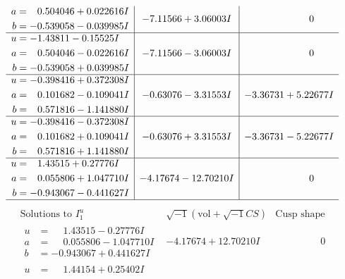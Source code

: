 \documentclass[1p]{elsarticle_modified}
\theoremstyle{definition}
\newcommand{\I}{\sqrt{-1}}
\begin{document}
$$\begin{array}{c|c|c}
\begin{aligned}
a &= \phantom{-}0.504046 + 0.022616 I \\
b &= -0.539058 - 0.039985 I\end{aligned}
 & -7.11566 + 3.06003 I & \phantom{-0.000000 } 0 \\ \hline\begin{aligned}
u &= -1.43811 - 0.15525 I \\
a &= \phantom{-}0.504046 - 0.022616 I \\
b &= -0.539058 + 0.039985 I\end{aligned}
 & -7.11566 - 3.06003 I & \phantom{-0.000000 } 0 \\ \hline\begin{aligned}
u &= -0.398416 + 0.372308 I \\
a &= \phantom{-}0.101682 - 0.109041 I \\
b &= \phantom{-}0.571816 - 1.141880 I\end{aligned}
 & -0.63076 - 3.31553 I & -3.36731 + 5.22677 I \\ \hline\begin{aligned}
u &= -0.398416 - 0.372308 I \\
a &= \phantom{-}0.101682 + 0.109041 I \\
b &= \phantom{-}0.571816 + 1.141880 I\end{aligned}
 & -0.63076 + 3.31553 I & -3.36731 - 5.22677 I \\ \hline\begin{aligned}
u &= \phantom{-}1.43515 + 0.27776 I \\
a &= \phantom{-}0.055806 + 1.047710 I \\
b &= -0.943067 - 0.441627 I\end{aligned}
 & -4.17674 - 12.70210 I & \phantom{-0.000000 } 0\\
 \hline 
 \end{array}$$\newpage$$\begin{array}{c|c|c}  
\text{Solutions to }I^u_{1}& \I (\text{vol} + \sqrt{-1}CS) & \text{Cusp shape}\\
 \hline 
\begin{aligned}
u &= \phantom{-}1.43515 - 0.27776 I \\
a &= \phantom{-}0.055806 - 1.047710 I \\
b &= -0.943067 + 0.441627 I\end{aligned}
 & -4.17674 + 12.70210 I & \phantom{-0.000000 } 0 \\ \hline\begin{aligned}
u &= \phantom{-}1.44154 + 0.25402 I \\

\end{aligned}
\end{array}$$
\end{document}

